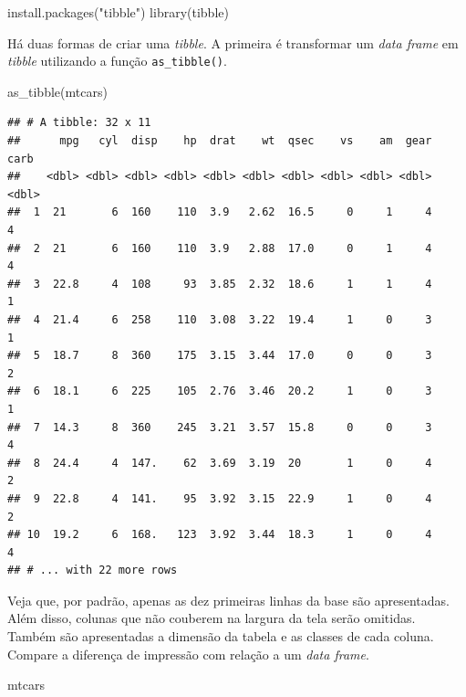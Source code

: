 \documentclass[
]{book}
\newenvironment{Shaded}{\begin{snugshade}}{\end{snugshade}}
\newcommand{\FunctionTok}[1]{\textcolor[rgb]{0.00,0.00,0.00}{#1}}
\newcommand{\NormalTok}[1]{#1}
\newcommand{\StringTok}[1]{\textcolor[rgb]{0.31,0.60,0.02}{#1}}
\begin{document}
\begin{Shaded}
\begin{Highlighting}[]
\FunctionTok{install.packages}\NormalTok{(}\StringTok{"tibble"}\NormalTok{)}
\FunctionTok{library}\NormalTok{(tibble)}
\end{Highlighting}
\end{Shaded}

Há duas formas de criar uma \emph{tibble}. A primeira é transformar um \emph{data frame} em \emph{tibble} utilizando a função \texttt{as\_tibble()}.

\begin{Shaded}
\begin{Highlighting}[]
\FunctionTok{as\_tibble}\NormalTok{(mtcars)}
\end{Highlighting}
\end{Shaded}

\begin{verbatim}
## # A tibble: 32 x 11
##      mpg   cyl  disp    hp  drat    wt  qsec    vs    am  gear  carb
##    <dbl> <dbl> <dbl> <dbl> <dbl> <dbl> <dbl> <dbl> <dbl> <dbl> <dbl>
##  1  21       6  160    110  3.9   2.62  16.5     0     1     4     4
##  2  21       6  160    110  3.9   2.88  17.0     0     1     4     4
##  3  22.8     4  108     93  3.85  2.32  18.6     1     1     4     1
##  4  21.4     6  258    110  3.08  3.22  19.4     1     0     3     1
##  5  18.7     8  360    175  3.15  3.44  17.0     0     0     3     2
##  6  18.1     6  225    105  2.76  3.46  20.2     1     0     3     1
##  7  14.3     8  360    245  3.21  3.57  15.8     0     0     3     4
##  8  24.4     4  147.    62  3.69  3.19  20       1     0     4     2
##  9  22.8     4  141.    95  3.92  3.15  22.9     1     0     4     2
## 10  19.2     6  168.   123  3.92  3.44  18.3     1     0     4     4
## # ... with 22 more rows
\end{verbatim}

Veja que, por padrão, apenas as dez primeiras linhas da base são apresentadas. Além disso, colunas que não couberem na largura da tela serão omitidas. Também são apresentadas a dimensão da tabela e as classes de cada coluna. Compare a diferença de impressão com relação a um \emph{data frame}.

\begin{Shaded}
\begin{Highlighting}[]
\NormalTok{mtcars}
\end{Highlighting}
\end{Shaded}
\end{document}
